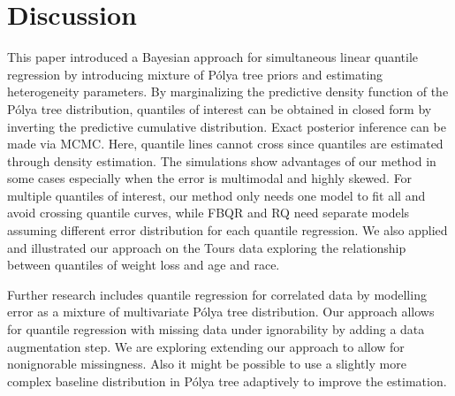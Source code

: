 \documentclass[12pt]{article}
\newcommand{\polya}{P\'{o}lya}
\begin{document}
\section{Discussion}
\label{ch2:sec:discussion}
This paper introduced a Bayesian approach for simultaneous linear
quantile regression by introducing mixture of \polya{} tree priors and
estimating heterogeneity parameters. By marginalizing the predictive
density function of the \polya{} tree distribution, quantiles of
interest can be obtained in closed form by inverting the predictive
cumulative distribution. Exact posterior inference can be made via
MCMC. Here, quantile lines cannot cross since quantiles are estimated
through density estimation. The simulations show advantages of our
method in some cases especially when the error is multimodal and
highly skewed.  For multiple quantiles of interest, our method only
needs one model to fit all and avoid crossing quantile curves, while
FBQR and RQ need separate models assuming different error distribution
for each quantile regression.  We also applied and illustrated our
approach on the Tours data exploring the relationship between
quantiles of weight loss and age and race.

Further research includes quantile regression for correlated data by
modelling error as a mixture of multivariate \polya{} tree
distribution.  Our approach allows for quantile regression with
missing data under ignorability by adding a data augmentation step.
We are exploring extending our approach to allow for nonignorable
missingness. Also it might be possible to use a slightly more complex
baseline distribution in \polya{} tree adaptively to improve the
estimation.


 
\end{document}
